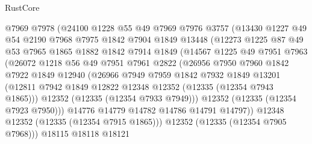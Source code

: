 \begin{lexlean}{RustCore}
\begin{coremodule}
                @7969
                @7978
                (@24100
                  @1228
                  @55
                  @49
                  @7969
                  @7976
                  @3757
                  (@13430
                    @1227
                    @49
                    @54
                    @2190
                    @7968
                    @7975
                    @1842
                    @7904
                    @1849
                    @13448
                    (@12273
                      @1225
                      @87
                      @49
                      @53
                      @7965
                      @1865
                      @1882
                      @1842
                      @7914
                      @1849
                      (@14567
                        @1225
                        @49
                        @7951
                        @7963
                        (@26072
                          @1218
                          @56
                          @49
                          @7951
                          @7961
                          @2822
                          (@26956
                            @7950
                            @7960
                            @1842
                            @7922
                            @1849
                            @12940
                            (@26966
                              @7949
                              @7959
                              @1842
                              @7932
                              @1849
                              @13201
                              (@12811
                                @7942
                                @1849
                                @12822
                                @12348
                                @12352
                                (@12335 (@12354 @7943 @1865)))
                              @12352
                              (@12335 (@12354 @7933 @7949)))
                            @12352
                            (@12335 (@12354 @7923 @7950)))
                          @14776
                          @14779
                          @14782
                          @14786
                          @14791
                          @14797))
                      @12348
                      @12352
                      (@12335 (@12354 @7915 @1865)))
                    @12352
                    (@12335 (@12354 @7905 @7968)))
                  @18115
                  @18118
                  @18121

\end{coremodule}
\end{lexlean}
